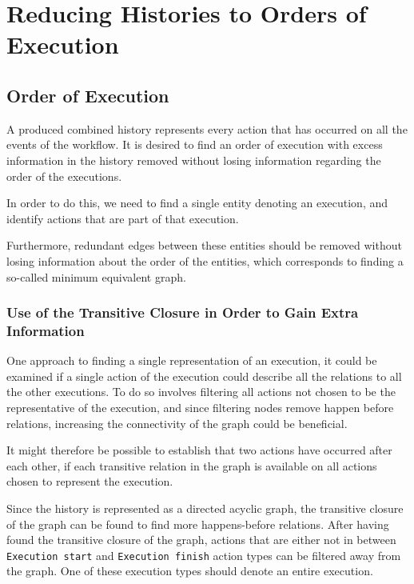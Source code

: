 \chapter{Reducing Histories to Orders of Execution}
\label{chap:order-of-execution}
\section{Order of Execution}
	A produced combined history represents every action that has occurred on all the events of the workflow.
	It is desired to find an order of execution with excess information in the history removed without losing information regarding the order of the executions. 
	
	\newpar In order to do this, we need to find a single entity denoting an execution, and identify actions that are part of that execution. 
	
	Furthermore, redundant edges between these entities should be removed without losing information about the order of the entities, which corresponds to finding a so-called minimum equivalent graph.
	
	\subsection{Use of the Transitive Closure in Order to Gain Extra Information}
	One approach to finding a single representation of an execution, it could be examined if a single action of the execution could describe all the relations to all the other executions. To do so involves filtering all actions not chosen to be the representative of the execution, and since filtering nodes remove happen before relations, increasing the connectivity of the graph could be beneficial.
	
	It might therefore be possible to establish that two actions have occurred after each other, if each transitive relation in the graph is available on all actions chosen to represent the execution.
	
	\newpar Since the history is represented as a directed acyclic graph, the transitive closure of the graph can be found to find more happens-before relations. 
	After having found the transitive closure of the graph, actions that are either not in between \texttt{Execution start} and \texttt{Execution finish} action types can be filtered away from the graph. One of these execution types should denote an entire execution.
	
